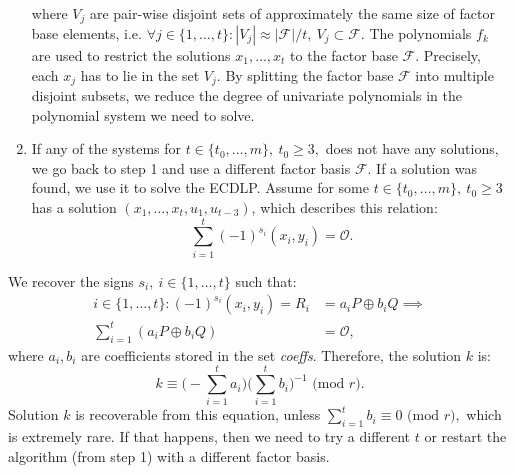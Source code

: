 \documentclass[thesis=M,english]{FITthesis}[2012/10/20]
\theoremstyle{remark}
\theoremstyle{definition}
\begin{document}
\begin{enumerate}
\begin{align*}
\end{align*}
where $V_j$ are pair-wise disjoint sets of approximately the same size of factor base elements, i.e. $\forall j \in \{1, \ldots, t\}: |V_j| \approx |\mathcal{F}|/t,\ V_j \subset \mathcal{F}.$ The polynomials $f_k$ are used to restrict the solutions $x_1,\ldots,x_t$ to the factor base $\mathcal{F}$. Precisely, each $x_j$ has to lie in the set $V_j$. By splitting the factor base $\mathcal{F}$ into multiple disjoint subsets, we reduce the degree of univariate polynomials in the polynomial system we need to solve.
\item If any of the systems for $t \in \{t_0, \ldots, m\},\ t_0 \geq 3,$ does not have any solutions, we go back to step 1 and use a different factor basis $\mathcal{F}$. If a solution was found, we use it to solve the ECDLP. Assume for some $t \in \{t_0, \ldots, m\},\ t_0 \geq 3$ has a solution $(x_1,\ldots,x_t, u_1, u_{t-3})$, which describes this relation:
$$
\sum_{i=1}^t (-1)^{s_i}(x_i, y_i) = \mathcal{O}.
$$
\end{enumerate}
We recover the signs $s_i,\ i \in \{1, \ldots, t\}$ such that:
\begin{align*}
 i \in \{1, \ldots, t\}: (-1)^{s_i}(x_i,y_i) = R_i &=  a_iP \oplus b_iQ \implies\\
 \sum_{i=1}^t(a_iP \oplus b_iQ) &= \mathcal{O},
 \end{align*}
 where $a_i, b_i$ are coefficients stored in the set \textit{coeffs}. Therefore, the solution $k$ is:
 $$
 k \equiv \bigg(-\sum_{i=1}^t a_i\bigg)\bigg(\sum_{i=1}^t b_i\bigg)^{-1} \text{ (mod $r$)}.
 $$
Solution $k$ is recoverable from this equation, unless $\sum_{i=1}^t b_i \equiv 0 \text{ (mod $r$)},$ which is extremely rare. If that happens, then we need to try a different $t$ or restart the algorithm (from step 1) with a different factor basis.
\end{document}
